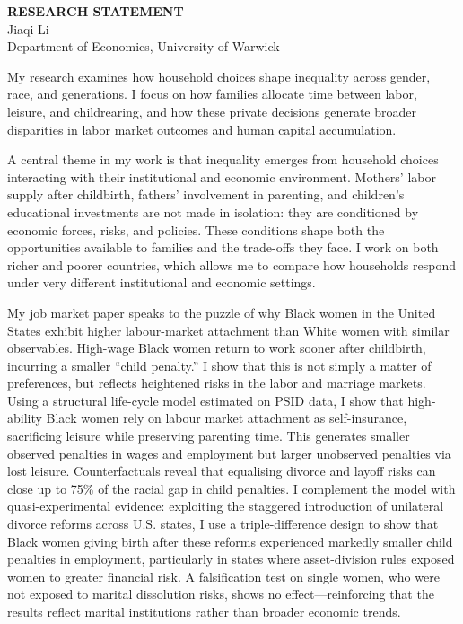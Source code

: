 \documentclass[11pt,a4paper]{article}
\begin{document}
\begin{center}
    {\Huge\bfseries RESEARCH STATEMENT} \\
    \vspace{0.5em}
    {\Large Jiaqi Li} \\
    \vspace{0.3em}
    Department of Economics, University of Warwick
\end{center}
\vspace{2em}

My research examines how household choices shape inequality across gender, race, and generations. I focus on how families allocate time between labor, leisure, and childrearing, and how these private decisions generate broader disparities in labor market outcomes and human capital accumulation.

A central theme in my work is that inequality emerges from household choices interacting with their institutional and economic environment. Mothers' labor supply after childbirth, fathers' involvement in parenting, and children's educational investments are not made in isolation: they are conditioned by economic forces, risks, and policies. These conditions shape both the opportunities available to families and the trade-offs they face. I work on both richer and poorer countries, which allows me to compare how households respond under very different institutional and economic settings.

My job market paper speaks to the puzzle of why Black women in the United States exhibit higher labour-market attachment than White women with similar observables. High-wage Black women return to work sooner after childbirth, incurring a smaller ``child penalty.'' I show that this is not simply a matter of preferences, but reflects heightened risks in the labor and marriage markets. Using a structural life-cycle model estimated on PSID data, I show that high-ability Black women rely on labour market attachment as self-insurance, sacrificing leisure while preserving parenting time. This generates smaller observed penalties in wages and employment but larger unobserved penalties via lost leisure. Counterfactuals reveal that equalising divorce and layoff risks can close up to 75\% of the racial gap in child penalties. I complement the model with quasi-experimental evidence: exploiting the staggered introduction of unilateral divorce reforms across U.S. states, I use a triple-difference design to show that Black women giving birth after these reforms experienced markedly smaller child penalties in employment, particularly in states where asset-division rules exposed women to greater financial risk. A falsification test on single women, who were not exposed to marital dissolution risks, shows no effect—reinforcing that the results reflect marital institutions rather than broader economic trends.
\end{document}
